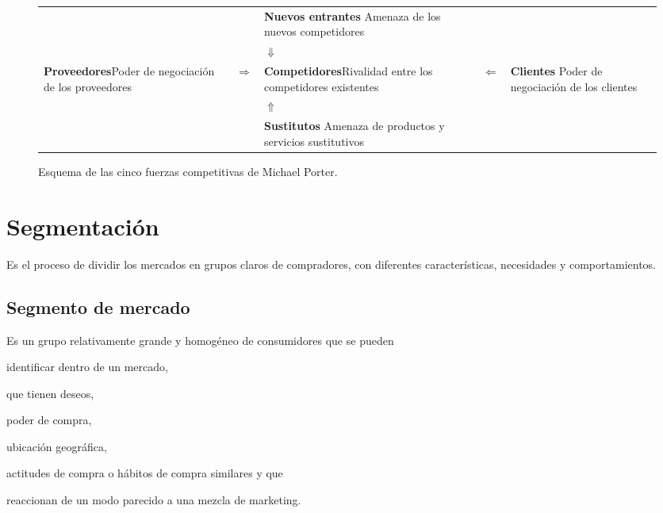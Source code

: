 \documentclass[12pt, spanish, a5paper]{article}
\begin{document}
\begin{figure*}[th]
	\centering
	{\footnotesize 
		
		\begin{tabular*}{\linewidth}{M{.2\linewidth} M{.1\linewidth} M{.2\linewidth} M{.1\linewidth} M{.2\linewidth}}
                                                              &               & \textbf{Nuevos entrantes} \linebreak Amenaza de los nuevos competidores      &              &  \\
                                                              &               & \bigskip $\Downarrow$ \bigskip                                               &              &  \\
\textbf{Proveedores}\linebreak Poder de negociación de los proveedores & $\Rightarrow$ & \textbf{Competidores}\linebreak Rivalidad entre los competidores existentes  & $\Leftarrow$ & \textbf{Clientes} \linebreak Poder de negociación de los clientes \\
                                                              &               & \bigskip $ \Uparrow$ \bigskip                                                &              &  \\
                                                              &               & \textbf{Sustitutos} \linebreak Amenaza de productos y servicios sustitutivos &              &
	\end{tabular*}
		
	}
	
	
	
	\caption[Las cuatro P]{Esquema de las cinco fuerzas competitivas de Michael Porter.}
	\label{fig:tiposempresa}
\end{figure*}


\section{Segmentación}

Es el proceso de dividir los mercados en grupos claros de compradores, con diferentes características, necesidades y comportamientos.

\subsection{Segmento de mercado}
Es un grupo relativamente grande y homogéneo de consumidores que se pueden 
\begin{enumerate*}[label=\itshape\alph*)]
	\item identificar dentro de un mercado, 
	\item que tienen deseos, 
	\item poder de compra, 
	\item ubicación geográfica,
	\item actitudes de compra o hábitos de compra similares y que 
	\item reaccionan de un modo parecido a una mezcla de marketing.
\end{enumerate*}
\end{document}
